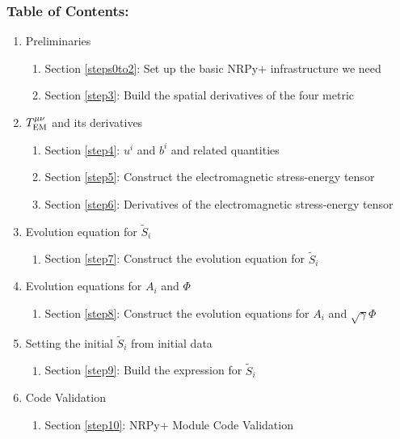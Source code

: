 \documentclass[landscape,letterpaper,10pt,english]{article}
\providecommand{\tightlist}{%
      \setlength{\itemsep}{0pt}\setlength{\parskip}{0pt}}
\begin{document}
\subsubsection{Table of Contents:}\label{table-of-contents}

\begin{enumerate}
\def\labelenumi{\arabic{enumi}.}
\tightlist
\item
  Preliminaries

  \begin{enumerate}
  \def\labelenumii{\arabic{enumii}.}
  \tightlist
  \item
    Section \ref{steps0to2}: Set up the basic NRPy+ infrastructure we
    need
  \item
    Section \ref{step3}: Build the spatial derivatives of the four
    metric
  \end{enumerate}
\item
  \(T^{\mu\nu}_{\rm EM}\) and its derivatives

  \begin{enumerate}
  \def\labelenumii{\arabic{enumii}.}
  \tightlist
  \item
    Section \ref{step4}: \(u^i\) and \(b^i\) and related quantities
  \item
    Section \ref{step5}: Construct the electromagnetic stress-energy
    tensor
  \item
    Section \ref{step6}: Derivatives of the electromagnetic
    stress-energy tensor
  \end{enumerate}
\item
  Evolution equation for \(\tilde{S}_i\)

  \begin{enumerate}
  \def\labelenumii{\arabic{enumii}.}
  \tightlist
  \item
    Section \ref{step7}: Construct the evolution equation for
    \(\tilde{S}_i\)
  \end{enumerate}
\item
  Evolution equations for \(A_i\) and \(\Phi\)

  \begin{enumerate}
  \def\labelenumii{\arabic{enumii}.}
  \tightlist
  \item
    Section \ref{step8}: Construct the evolution equations for \(A_i\)
    and \(\sqrt{\gamma}\Phi\)
  \end{enumerate}
\item
  Setting the initial \(\tilde{S}_i\) from initial data

  \begin{enumerate}
  \def\labelenumii{\arabic{enumii}.}
  \tightlist
  \item
    Section \ref{step9}: Build the expression for \(\tilde{S}_i\)
  \end{enumerate}
\item
  Code Validation

  \begin{enumerate}
  \def\labelenumii{\arabic{enumii}.}
  \tightlist
  \item
    Section \ref{step10}: NRPy+ Module Code Validation
  \end{enumerate}
\end{enumerate}
\end{document}
